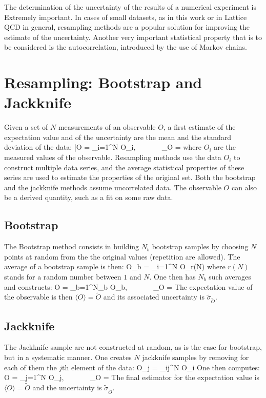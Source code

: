 The determination of the uncertainty of the results of a numerical experiment is Extremely important. In cases of small datasets, as in this work or in Lattice QCD in general, resampling methods are a popular solution for improving the estimate of the uncertainty. Another very important statistical property that is to be considered is the autocorrelation, introduced by the use of Markov chains.

\section{Resampling: Bootstrap and Jackknife}
Given a set of $N$ measurements of an observable $O$, a first estimate of the expectation value and of the uncertainty are the mean and the standard deviation of the data:
\beq
    \bar O = \sum_{i=1}^N O_i, ~~~~~~ \sigma_O = 
\eeq
where $O_i$ are the measured values of the observable. Resampling methods use the data $O_i$ to construct multiple data series, and the average statistical properties of these series are used to estimate the properties of the original set. Both the bootstrap and the jackknife methods assume uncorrelated data. The observable $O$ can also be a derived quantity, such as a fit on some raw data.

\subsection{Bootstrap}
\label{app:resampling}
The Bootstrap method consists in building $N_b$ bootstrap samples by choosing $N$ points at random from the the original values (repetition are allowed). The average of a bootstrap sample is then:
\beq
    \hat O_b = \sum_{i=1}^N O_{r(N)}
\eeq
where $r(N)$ stands for a random number between $1$ and $N$. One then has $N_b$ such averages and constructs:
\beq
    \tilde O = \sum_{b=1}^{N_b} \hat O_b, ~~~~~~ \tilde\sigma_{\tilde O} = 
\eeq
The expectation value of the observable is then $\langle O \rangle = \tilde O$ and its associated uncertainty is $\tilde\sigma_{\tilde O}$.

\subsection{Jackknife}
The Jackknife sample are not constructed at random, as is the case for bootstrap, but in a systematic manner. One creates $N$ jackknife samples by removing for each of them the $j$th element of the data:
\beq
\hat O_j = \sum_{i\neq j}^N O_i
\eeq
One then computes:
\beq
\tilde O = \sum_{j=1}^{N} \hat O_j, ~~~~~~ \tilde\sigma_{\tilde O} = 
\eeq
The final estimator for the expectation value is  $\langle O \rangle = \tilde O$ and the uncertainty is $\tilde\sigma_{\tilde O}$.\\

